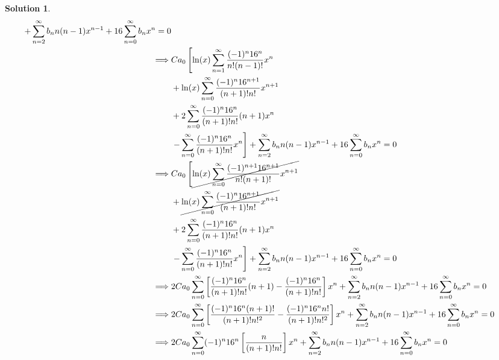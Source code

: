\documentclass[10pt]{article}
\theoremstyle{definition}
\newtheorem{soln}{Solution}
\begin{document}
\begin{soln}
\begin{align*}
    +\sum_{n=2}^{\infty}b_nn(n-1)x^{n-1}
    +16\sum_{n=0}^{\infty}b_nx^{n} =0                                                                           \\
    \implies & Ca_0\left[\ln(x)\sum_{n=1}^{\infty}\frac{(-1)^n16^n}{n!(n-1)!}x^{n}\right.                       \\
             & +\ln(x)\sum_{n=0}^{\infty}\frac{(-1)^n16^{n+1}}{(n+1)!n!}x^{n+1}                                 \\
             & +2\sum_{n=0}^{\infty}\frac{(-1)^n16^n}{(n+1)!n!}(n+1)x^{n}                                       \\
             & \left.-\sum_{n=0}^{\infty}\frac{(-1)^n16^n}{(n+1)!n!}x^{n}\right]
    +\sum_{n=2}^{\infty}b_nn(n-1)x^{n-1}
    +16\sum_{n=0}^{\infty}b_nx^{n} =0                                                                           \\
    \implies & Ca_0\left[\cancel{\ln(x)\sum_{n=0}^{\infty}\frac{(-1)^{n+1}16^{n+1}}{n!(n+1)!}x^{n+1}}\right.    \\
             & +\cancel{\ln(x)\sum_{n=0}^{\infty}\frac{(-1)^n16^{n+1}}{(n+1)!n!}x^{n+1}}                        \\
             & +2\sum_{n=0}^{\infty}\frac{(-1)^n16^n}{(n+1)!n!}(n+1)x^{n}                                       \\
             & \left.-\sum_{n=0}^{\infty}\frac{(-1)^n16^n}{(n+1)!n!}x^{n}\right]
    +\sum_{n=2}^{\infty}b_nn(n-1)x^{n-1}
    +16\sum_{n=0}^{\infty}b_nx^{n} =0                                                                           \\
    \implies &
    2Ca_0\sum_{n=0}^{\infty}\left[\frac{(-1)^n16^n}{(n+1)!n!}(n+1)-\frac{(-1)^n16^n}{(n+1)!n!}\right]x^{n}
    +\sum_{n=2}^{\infty}b_nn(n-1)x^{n-1}
    +16\sum_{n=0}^{\infty}b_nx^{n} =0                                                                           \\
    \implies &
    2Ca_0\sum_{n=0}^{\infty}\left[\frac{(-1)^n16^n(n+1)!}{(n+1)!n!^2}-\frac{(-1)^n16^nn!}{(n+1)!n!^2}\right]x^{n}
    +\sum_{n=2}^{\infty}b_nn(n-1)x^{n-1}
    +16\sum_{n=0}^{\infty}b_nx^{n} =0                                                                           \\
    \implies &
    2Ca_0\sum_{n=0}^{\infty}(-1)^n16^n\left[\frac{n}{(n+1)!n!}\right]x^{n}
    +\sum_{n=2}^{\infty}b_nn(n-1)x^{n-1}
    +16\sum_{n=0}^{\infty}b_nx^{n} =0                                                                           \\

\end{align*}
\end{soln}
\end{document}
